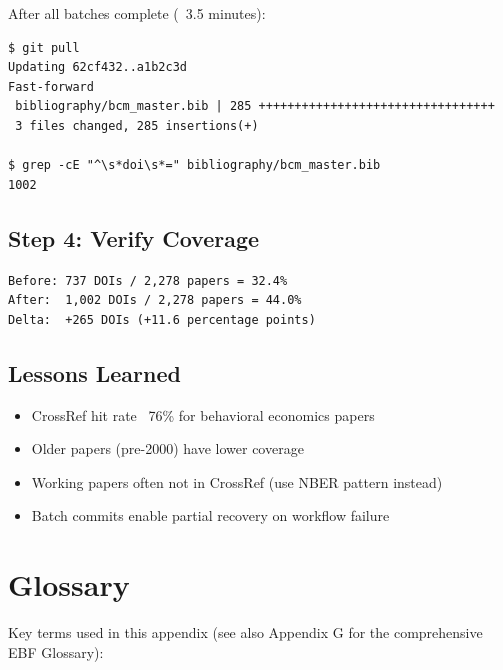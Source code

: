 After all batches complete (~3.5 minutes):

\begin{verbatim}
$ git pull
Updating 62cf432..a1b2c3d
Fast-forward
 bibliography/bcm_master.bib | 285 +++++++++++++++++++++++++++++++++
 3 files changed, 285 insertions(+)

$ grep -cE "^\s*doi\s*=" bibliography/bcm_master.bib
1002
\end{verbatim}

\subsection{Step 4: Verify Coverage}

\begin{verbatim}
Before: 737 DOIs / 2,278 papers = 32.4%
After:  1,002 DOIs / 2,278 papers = 44.0%
Delta:  +265 DOIs (+11.6 percentage points)
\end{verbatim}

\subsection{Lessons Learned}

\begin{itemize}
    \item CrossRef hit rate ~76\% for behavioral economics papers
    \item Older papers (pre-2000) have lower coverage
    \item Working papers often not in CrossRef (use NBER pattern instead)
    \item Batch commits enable partial recovery on workflow failure
\end{itemize}

\section{Glossary}
\label{sec:api-glossary}

Key terms used in this appendix (see also Appendix G for the comprehensive EBF Glossary):

